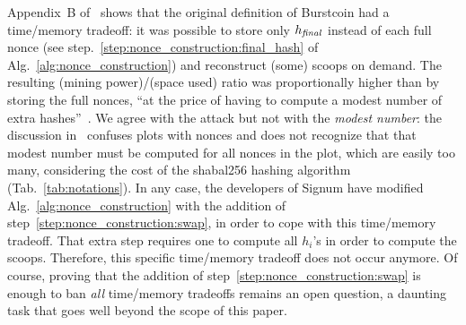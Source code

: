 Appendix~B of~\cite{ParkKFGAP18} shows that the
original definition of Burstcoin had a time/memory tradeoff:
it was possible to store only ${h_{\mathit{final}}}$ instead of each full nonce
(see step.~\ref{step:nonce_construction:final_hash} of Alg.~\ref{alg:nonce_construction}) and
reconstruct (some) scoops on demand. The resulting (mining power)/(space used) ratio was proportionally higher
than by storing the full nonces,
``at the price of having to compute a modest number of extra hashes''~\cite{ParkKFGAP18}.
We agree with the attack but not with the \emph{modest number}: the discussion in~\cite{ParkKFGAP18}
confuses plots with nonces and does not recognize that that modest number
must be computed for all nonces in the plot, which are easily too many, considering the
cost of the shabal256 hashing algorithm (Tab.~\ref{tab:notations}). In any case, the developers
of Signum have modified Alg.~\ref{alg:nonce_construction} with the addition of
step~\ref{step:nonce_construction:swap}, in order to cope with this time/memory tradeoff.
That extra step requires one to compute all $h_i$'s in order to compute the scoops.
Therefore, this specific time/memory tradeoff does not occur anymore. Of course, proving
that the addition of step~\ref{step:nonce_construction:swap} is enough to ban \emph{all}
time/memory tradeoffs remains an open question,
a daunting task that goes well beyond the scope of this paper.

